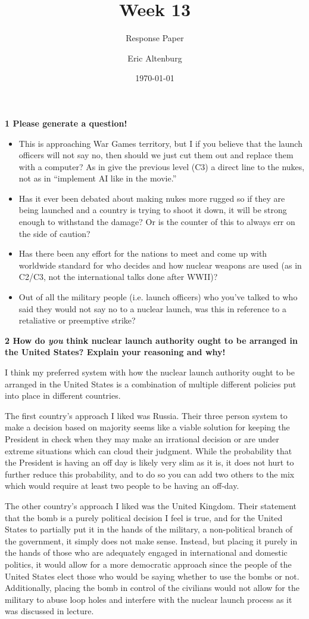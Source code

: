 \documentclass[12pt]{turabian-researchpaper}
\title{Week 13}
\subtitle{Response Paper}
\author{Eric Altenburg}
\date{\today}
\newcommand\question[2]{\noindent\textbf{#1 \quad #2}}
\begin{document}
\maketitle

\question{1}{Please generate a question!}

	\begin{itemize}
		\item This is approaching War Games territory, but I if you believe that the launch officers will not say no, then should we just cut them out and replace them with a computer? As in give the previous level (C3) a direct line to the nukes, not as in “implement AI like in the movie.”
		\item Has it ever been debated about making nukes more rugged so if they are being launched and a country is trying to shoot it down, it will be strong enough to withstand the damage? Or is the counter of this to always err on the side of caution?
		\item Has there been any effort for the nations to meet and come up with worldwide standard for who decides and how nuclear weapons are used (as in C2/C3, not the international talks done after WWII)?
		\item Out of all the military people (i.e. launch officers) who you’ve talked to who said they would not say no to a nuclear launch, was this in reference to a retaliative or preemptive strike?
	\end{itemize}


\question{2}{How do \textit{you} think nuclear launch authority ought to be arranged in the United States? Explain your reasoning and why!}

	I think my preferred system with how the nuclear launch authority ought to be arranged in the United States is a combination of multiple different policies put into place in different countries.

	The first country's approach I liked was Russia. Their three person system to make a decision based on majority seems like a viable solution for keeping the President in check when they may make an irrational decision or are under extreme situations which can cloud their judgment. While the probability that the President is having an off day is likely very slim as it is, it does not hurt to further reduce this probability, and to do so you can add two others to the mix which would require at least two people to be having an off-day.

	The other country's approach I liked was the United Kingdom. Their statement that the bomb is a purely political decision I feel is true, and for the United States to partially put it in the hands of the military, a non-political branch of the government, it simply does not make sense. Instead, but placing it purely in the hands of those who are adequately engaged in international and domestic politics, it would allow for a more democratic approach since the people of the United States elect those who would be saying whether to use the bombs or not. Additionally, placing the bomb in control of the civilians would not allow for the military to abuse loop holes and interfere with the nuclear launch process as it was discussed in lecture.
\end{document}
